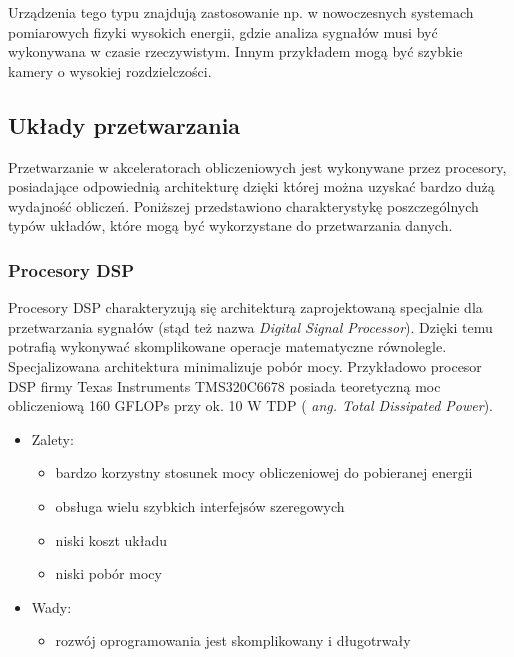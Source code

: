 Urządzenia tego typu znajdują zastosowanie np. w nowoczesnych systemach pomiarowych fizyki wysokich energii, gdzie analiza sygnałów musi być wykonywana w czasie rzeczywistym. Innym przykładem mogą być szybkie kamery o wysokiej rozdzielczości.

 
\subsection{Układy przetwarzania} %
Przetwarzanie w akceleratorach obliczeniowych jest wykonywane przez procesory, posiadające odpowiednią architekturę dzięki której można uzyskać bardzo dużą wydajność obliczeń. Poniższej przedstawiono charakterystykę poszczególnych typów układów, które mogą być wykorzystane do przetwarzania danych. 

\subsubsection{Procesory DSP}
Procesory DSP charakteryzują się architekturą zaprojektowaną specjalnie dla przetwarzania sygnałów (stąd też nazwa \textit{Digital Signal Processor}). Dzięki temu potrafią wykonywać skomplikowane operacje matematyczne równolegle. Specjalizowana architektura minimalizuje pobór mocy. Przykładowo procesor DSP firmy Texas Instruments \cite{COMPANY:TEXAS} TMS320C6678 posiada teoretyczną moc obliczeniową 160 GFLOPs przy ok. 10 W TDP (\textit{ ang. Total Dissipated Power}). 

\begin{itemize}
\item Zalety:
\begin{itemize}
\item bardzo korzystny stosunek mocy obliczeniowej do pobieranej energii
\item obsługa wielu szybkich interfejsów szeregowych
\item niski koszt układu
\item niski pobór mocy
\end{itemize}

\item Wady:
\begin{itemize}
\item rozwój oprogramowania jest skomplikowany i długotrwały
\end{itemize}

\end{itemize}

